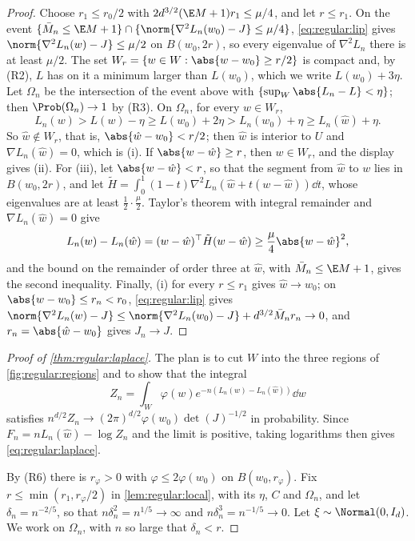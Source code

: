 \begin{refsection}
\begin{proof}
Choose $r_1\le r_0/2$ with $2d^{3/2}(\E M+1)r_1\le\mu/4$, and let $r\le r_1$. On the event $\{\bar M_n\le\E M+1\}\cap\{\norm{\nabla^2L_n(w_0)-J}\le\mu/4\}$, \eqref{eq:regular:lip} gives $\norm{\nabla^2L_n(w)-J}\le\mu/2$ on $B(w_0,2r)$, so every eigenvalue of $\nabla^2L_n$ there is at least $\mu/2$. The set $W_r=\{w\in W:\abs{w-w_0}\ge r/2\}$ is compact and, by (R2), $L$ has on it a minimum larger than $L(w_0)$, which we write $L(w_0)+3\eta$. Let $\Omega_n$ be the intersection of the event above with $\{\sup_W\abs{L_n-L}<\eta\}$; then $\Prob(\Omega_n)\to1$ by (R3). On $\Omega_n$, for every $w\in W_r$,
\[
L_n(w)>L(w)-\eta\ge L(w_0)+2\eta>L_n(w_0)+\eta\ge L_n(\hat w)+\eta .
\]
So $\hat w\notin W_r$, that is, $\abs{\hat w-w_0}<r/2$; then $\hat w$ is interior to $U$ and $\nabla L_n(\hat w)=0$, which is (i). If $\abs{w-\hat w}\ge r$, then $w\in W_r$, and the display gives (ii). For (iii), let $\abs{w-\hat w}<r$, so that the segment from $\hat w$ to $w$ lies in $B(w_0,2r)$, and let $\tilde H=\int_0^1(1-t)\nabla^2L_n(\hat w+t(w-\hat w))\dd t$, whose eigenvalues are at least $\frac12\cdot\frac\mu2$. Taylor's theorem with integral remainder and $\nabla L_n(\hat w)=0$ give
\[
L_n(w)-L_n(\hat w)=(w-\hat w)^\top\tilde H(w-\hat w)\ge\frac\mu4\abs{w-\hat w}^2,
\]
and the bound on the remainder of order three at $\hat w$, with $\bar M_n\le\E M+1$, gives the second inequality. Finally, (i) for every $r\le r_1$ gives $\hat w\to w_0$; on $\abs{w-w_0}\le r_n<r_0$, \eqref{eq:regular:lip} gives $\norm{\nabla^2L_n(w)-J}\le\norm{\nabla^2L_n(w_0)-J}+d^{3/2}\bar M_nr_n\to0$, and $r_n=\abs{\hat w-w_0}$ gives $J_n\to J$.
\end{proof}

\begin{proof}[Proof of \cref{thm:regular:laplace}]
The plan is to cut $W$ into the three regions of \cref{fig:regular:regions} and to show that the integral
\[
Z_n=\int_W\varphi(w)e^{-n(L_n(w)-L_n(\hat w))}\dd w
\]
satisfies $n^{d/2}Z_n\to(2\pi)^{d/2}\varphi(w_0)\det(J)^{-1/2}$ in probability. Since $F_n=nL_n(\hat w)-\log Z_n$ and the limit is positive, taking logarithms then gives \eqref{eq:regular:laplace}.

By (R6) there is $r_\varphi>0$ with $\varphi\le2\varphi(w_0)$ on $B(w_0,r_\varphi)$. Fix $r\le\min(r_1,r_\varphi/2)$ in \cref{lem:regular:local}, with its $\eta$, $C$ and $\Omega_n$, and let $\delta_n=n^{-2/5}$, so that $n\delta_n^2=n^{1/5}\to\infty$ and $n\delta_n^3=n^{-1/5}\to0$. Let $\xi\sim\Normal(0,I_d)$. We work on $\Omega_n$, with $n$ so large that $\delta_n<r$.


\end{proof}
\end{refsection}
